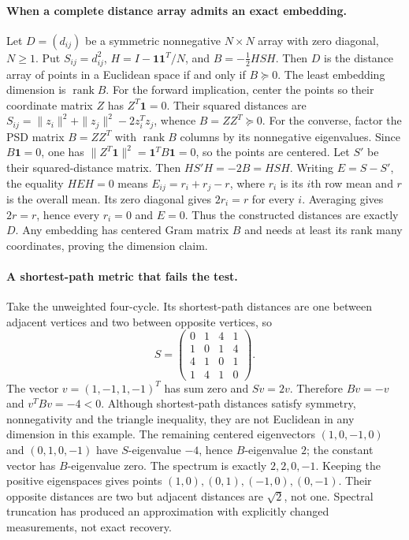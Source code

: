 \documentclass[11pt]{article}
\begin{document}
\paragraph{When a complete distance array admits an exact embedding.}
Let $D=(d_{ij})$ be a symmetric nonnegative $N\times N$ array with zero
diagonal, $N\geq1$. Put $S_{ij}=d_{ij}^2$,
$H=I-\mathbf1\mathbf1^T/N$, and $B=-\frac12HSH$.
Then $D$ is the distance array of points in a Euclidean space if and only if
$B\succeq0$. The least embedding dimension is $\operatorname{rank}B$.
For the forward implication, center the points so their coordinate matrix $Z$
has $Z^T\mathbf1=0$. Their squared distances are
$S_{ij}=\|z_i\|^2+\|z_j\|^2-2z_i^Tz_j$, whence $B=ZZ^T\succeq0$.
For the converse, factor the PSD matrix $B=ZZ^T$ with $\operatorname{rank}B$
columns by its nonnegative eigenvalues. Since $B\mathbf1=0$, one has
$\|Z^T\mathbf1\|^2=\mathbf1^TB\mathbf1=0$, so the points are centered.
Let $S'$ be their squared-distance matrix. Then $HS'H=-2B=HSH$.
Writing $E=S-S'$, the equality $HEH=0$ means
$E_{ij}=r_i+r_j-r$, where $r_i$ is its $i$th row mean and $r$ is the overall
mean. Its zero diagonal gives $2r_i=r$ for every $i$. Averaging gives
$2r=r$, hence every $r_i=0$ and $E=0$. Thus the constructed distances are
exactly $D$. Any embedding has centered Gram matrix $B$ and needs at least
its rank many coordinates, proving the dimension claim.

\paragraph{A shortest-path metric that fails the test.}
Take the unweighted four-cycle. Its shortest-path distances are one between
adjacent vertices and two between opposite vertices, so
\[
 S=\begin{pmatrix}0&1&4&1\\1&0&1&4\\4&1&0&1\\1&4&1&0\end{pmatrix}.
\]
The vector $v=(1,-1,1,-1)^T$ has sum zero and $Sv=2v$.
Therefore $Bv=-v$ and $v^TBv=-4<0$.
Although shortest-path distances satisfy symmetry, nonnegativity and the triangle
inequality, they are not Euclidean in any dimension in this example.
The remaining centered eigenvectors $(1,0,-1,0)$ and $(0,1,0,-1)$ have
$S$-eigenvalue $-4$, hence $B$-eigenvalue $2$; the constant vector has
$B$-eigenvalue zero. The spectrum is exactly $2,2,0,-1$.
Keeping the positive eigenspaces gives points
$(1,0),(0,1),(-1,0),(0,-1)$. Their opposite distances are two but adjacent
distances are $\sqrt2$, not one. Spectral truncation has produced an
approximation with explicitly changed measurements, not exact recovery.
\end{document}
